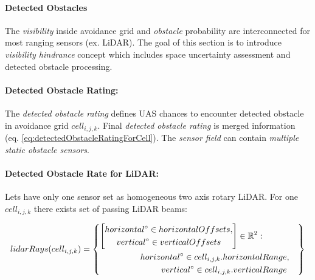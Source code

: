 \paragraph{Detected Obstacles} The \emph{visibility} inside avoidance grid and \emph{obstacle} probability are interconnected for most ranging sensors (ex. LiDAR). The goal of this section is to introduce \emph{visibility hindrance} concept which includes space uncertainty assessment and detected obstacle  processing.

\paragraph{Detected Obstacle Rating:} The \emph{detected obstacle rating} defines UAS chances to encounter detected obstacle in avoidance grid $cell_{i,j,k}$. Final \emph{detected obstacle rating} is merged information (eq. \ref{eq:detectedObstacleRatingForCell}). The \emph{sensor field} can contain \emph{multiple} \emph{static obstacle sensors}.

\paragraph{Detected Obstacle Rate for LiDAR:} Lets have only one sensor set as homogeneous two axis rotary LiDAR. For one $cell_{i,j,k}$ there exists set of passing LiDAR beams:

\begin{equation}\label{eq:lidarRaysTroughCell}
    lidar Rays(cell_{i,j,k})=
    \left\{
        \begin{aligned}
        \left[
            \begin{gathered}
                horizontal^\circ\in horizontal Offsets,\\
                vertical^\circ\in vertical Offsets
            \end{gathered}
        \right]\in\mathbb{R}^2:&\\
        horizontal^\circ\in cell_{i,j,k}.horizontal &Range,\\
        vertical^\circ\in cell_{i,j,k}.vertical &Range\\
        \end{aligned}
    \right\}
\end{equation}

